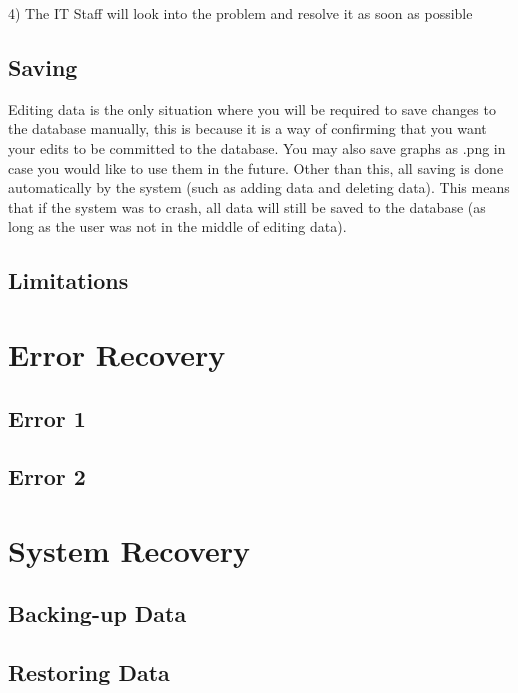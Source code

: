 4) The IT Staff will look into the problem and resolve it as soon as possible

\subsection{Saving}

Editing data is the only situation where you will be required to save changes to the database manually, this is because it is a way of confirming that you want your edits to be committed to the database. You may also save graphs as .png in case you would like to use them in the future. Other than this, all saving is done automatically by the system (such as adding data and deleting data). This means that if the system was to crash, all data will still be saved to the database (as long as the user was not in the middle of editing data).

\subsection{Limitations}

\section{Error Recovery}

\subsection{Error 1}

\subsection{Error 2}

\section{System Recovery}

\subsection{Backing-up Data}

\subsection{Restoring Data}
